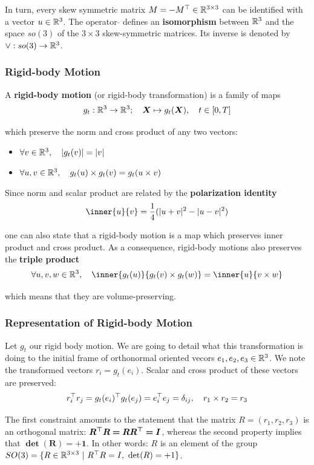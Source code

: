 In turn, every skew symmetric matrix $M = -M^{\top} \in \mathbb{R}^{3 \times{} 3}$
can be identified with a vector $u \in \mathbb{R}^3$.
The operator $\widehat{}$ defines an \textbf{isomorphism} between $\mathbb{R}^3$
and the space $so(3)$ of the $3 \times 3$ skew-symmetric matrices.
Its inverse is denoted by $\vee : so(3) \rightarrow \mathbb{R}^3$.


\subsubsection{Rigid-body Motion}%
\label{ssub:rigid_body_motion}

A \textbf{rigid-body motion} (or rigid-body transformation)
is a family of maps
\[g_t : \mathbb{R}^3 \rightarrow \mathbb{R}^3;\quad \bm{X} \mapsto g_t(\bm{X}),\quad t \in [0,T]\]

which preserve the norm and cross product of any two vectors:
\begin{itemize}
	\setlength\itemsep{-0.2em}
	\item $\forall v \in \mathbb{R}^3, \quad |g_t(v)| = |v|$
	\item $\forall u,v \in \mathbb{R}^3, \quad g_t(u) \times g_t(v) = g_t(u \times v)$
\end{itemize}

Since norm and scalar product are related by the \textbf{polarization identity}
\[\inner{u}{v} = \frac{1}{4}(|u+v|^2 - |u-v|^2)\]

one can also state that a rigid-body motion is a map which
preserves inner product and cross product.
As a consequence, rigid-body motions also preserves the \textbf{triple product}
\[\forall u, v, w \in \R^3, \quad
	\inner{g_t(u)}{g_t(v) \times g_t(w)} = \inner{u}{v \times w}\]

which means that they are volume-preserving.


\subsubsection{Representation of Rigid-body Motion}%
\label{ssub:representation_of_rigid_body_motion}

Let $g_t$ our rigid body motion. We are going to detail what this transformation
is doing to the initial frame of orthonormal oriented vecors
$e_1, e_2, e_3 \in \mathbb{R}^3$.
We note the transformed vectors $r_i = g_t(e_i)$.
Scalar and cross product of these vectors are preserved:
	\[r_i^{\top}r_j = g_t(e_i)^{\top}g_t(e_j) = e_i^{\top}e_j = \delta_{ij}, \quad
	r_1 \times r_2 = r_3\]

The first constraint amounts to the statement that the matrix
$R = (r_1, r_2, r_3)$ is an orthogonal matrix: $\bm{R^{\top}R=RR^{\top}=I}$,
whereas the second property implies that $\bm{\det(R) = +1}$.
In other words: $R$ is an element of the group
$SO(3) = \{R \in \mathbb{R}^{3 \times{} 3}\ |\ R^{\top}R=I,\ \det(R) = +1\}$.\\

